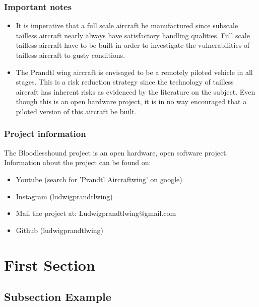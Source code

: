 \documentclass{beamer}
\begin{document}
\begin{frame}
\frametitle{Important notes}

\begin{itemize}
\item It is imperative that a full scale aircraft 
be manufactured since subscale tailless aircraft nearly always have satisfactory handling qualities.  Full scale tailless aircraft 
have to be built in order to investigate the vulnerabilities of tailless aircraft to gusty conditions.
\item The Prandtl wing aircraft is envisaged to be a remotely piloted vehicle in all stages.  This is a risk reduction strategy since the technology of tailless aircraft has inherent risks as evidenced by the literature on the subject.  Even though this is an open hardware project, it is in no way encouraged that a piloted version of this aircraft be built.
\end{itemize}

\end{frame}




\begin{frame}
\frametitle{Project information}

The Bloodlesshound project is an open hardware, open software project.  Information about the project can be found on:  

\begin{itemize}
\item Youtube (search for 'Prandtl Aircraftwing' on google)
\item Instagram (ludwigprandtlwing)
\item Mail the project at: Ludwigprandtlwing@gmail.com 
\item Github (ludwigprandtlwing)
\end{itemize}

\end{frame}




\section{First Section} %

\subsection{Subsection Example} %
\end{document}
